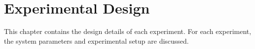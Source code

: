 \chapter{Experimental Design}

This chapter contains the design details of each experiment. For each experiment, the system parameters and experimental setup are discussed.




